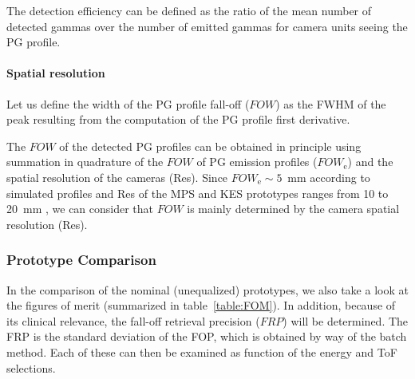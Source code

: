 \documentclass[a4paper,english]{article}
\begin{document}
The detection efficiency can be defined as the ratio of the mean number of detected gammas over the number of emitted gammas for camera units seeing the PG profile.

\paragraph{Spatial resolution}

Let us define the width of the PG profile fall-off ($FOW$) as the FWHM of the peak resulting from the computation of the PG profile first derivative.

The $FOW$ of the detected PG profiles can be obtained in principle using summation in quadrature of the $FOW$ of PG emission profiles ($FOW_\text{e}$) and the spatial resolution of the cameras (Res). Since $FOW_\text{e}\sim5$~mm according to simulated profiles \citep{Krimmer2017a} and Res of the MPS and KES prototypes ranges from 10 to 20~mm \citep{Pinto2014a, Smeets2012}, we can consider that $FOW$ is mainly determined by the camera spatial resolution (Res). 


\subsubsection{Prototype Comparison}

In the comparison of the nominal (unequalized) prototypes, we also take a look at the figures of merit (summarized in table~\ref{table:FOM}). In addition, because of its clinical relevance, the fall-off retrieval precision ($FRP$) will be determined. The FRP is the standard deviation of the FOP, which is obtained by way of the batch method. Each of these can then be examined as function of the energy and ToF selections.
\end{document}
